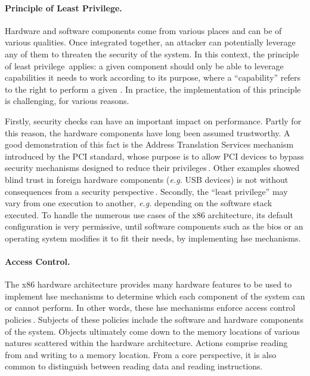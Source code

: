 \paragraph{Principle of Least Privilege.}
%
Hardware and software components come from various places and can be of various
qualities.
%
Once integrated together, an attacker can potentially leverage any of them to
threaten the security of the system.
%
In this context, the principle of least
privilege\,\cite{saltzer1975leastprivilege} applies: a given component should
only be able to leverage capabilities it needs to work according to its purpose,
where a ``capability'' refers to the right to perform a given \IO.
%
In practice, the implementation of this principle is challenging, for various
reasons.

Firstly, security checks can have an important impact on performance.
%
Partly for this reason, the hardware components have long been assumed
trustworthy.
%
A good demonstration of this fact is the Address Translation Services mechanism
introduced by the PCI standard, whose purpose is to allow PCI devices to bypass
security mechanisms designed to reduce their
privileges\,\cite{daubignard2017protip}.
%
Other examples showed blind trust in foreign hardware components (\emph{e.g.}
USB devices) is not without consequences from a security
perspective\,\cite{nohl2014badusb,hudson2015thunderstrike,chifflier2013uefi}.
%
Secondly, the ``least privilege'' may vary from one execution to another,
\emph{e.g.} depending on the software stack executed.
%
To handle the numerous use cases of the x86 architecture, its default
configuration is very permissive, until software components such as the
\ac{bios} or an operating system modifies it to fit their needs, by implementing
\ac{hse} mechanisms.


\paragraph{Access Control.}
%
The x86 hardware architecture provides many hardware features to be used to
implement \ac{hse} mechanisms
%
%
to determine which \IO each component of the system can or cannot perform.
%
In other words, these \ac{hse} mechanisms enforce access control
policies\,\cite{sandhu1994access}.
%
Subjects of these policies include the software and hardware components of the
system.
%
Objects ultimately come down to the memory locations of various natures
scattered within the hardware architecture.
%
Actions comprise reading from and writing to a memory location. From a core
perspective, it is also common to distinguish between reading data and reading
instructions.

